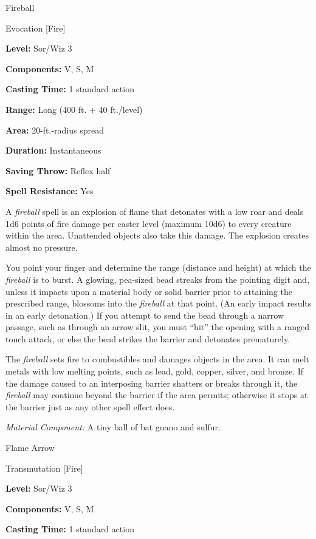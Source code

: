 \documentclass{article}
\begin{document}
\vspace{12pt}
Fireball

Evocation [Fire]

\textbf{Level:} Sor/Wiz 3

\textbf{Components:} V, S, M

\textbf{Casting Time:} 1 standard action

\textbf{Range:} Long (400 ft. + 40 ft./level)

\textbf{Area:} 20-ft.-radius spread

\textbf{Duration:} Instantaneous

\textbf{Saving Throw:} Reflex half

\textbf{Spell Resistance:} Yes

A \textit{fireball }spell is an explosion of flame that detonates with a low roar 
and deals 1d6 points of fire damage per caster level (maximum 10d6) to every creature 
within the area. Unattended objects also take this damage. The explosion creates 
almost no pressure.

You point your finger and determine the range (distance and height) at which the 
\textit{fireball }is to burst. A glowing, pea-sized bead streaks from the pointing 
digit and, unless it impacts upon a material body or solid barrier prior to attaining 
the prescribed range, blossoms into the \textit{fireball }at that point. (An early 
impact results in an early detonation.) If you attempt to send the bead through 
a narrow passage, such as through an arrow slit, you must ``hit'' the opening with 
a ranged touch attack, or else the bead strikes the barrier and detonates prematurely.

The \textit{fireball }sets fire to combustibles and damages objects in the area. 
It can melt metals with low melting points, such as lead, gold, copper, silver, 
and bronze. If the damage caused to an interposing barrier shatters or breaks through 
it, the \textit{fireball }may continue beyond the barrier if the area permits; 
otherwise it stops at the barrier just as any other spell effect does.

\textit{Material Component: }A tiny ball of bat guano and sulfur.

\vspace{12pt}
Flame Arrow

Transmutation [Fire]

\textbf{Level:} Sor/Wiz 3

\textbf{Components:} V, S, M

\textbf{Casting Time:} 1 standard action
\end{document}
